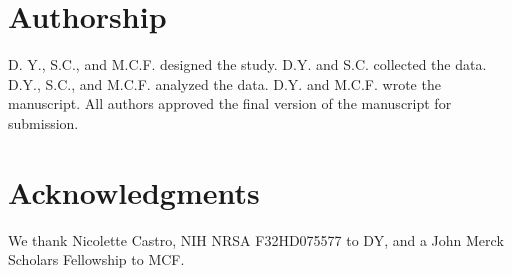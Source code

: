 \documentclass[man,floatsintext]{apa6}
\begin{document}

\section{Authorship}
D. Y., S.C., and M.C.F. designed the study. D.Y. and S.C. collected the data. D.Y., S.C., and M.C.F. analyzed the data. D.Y. and M.C.F. wrote the manuscript. All authors approved the final version of the manuscript for submission.

\section{Acknowledgments}

We thank Nicolette Castro, NIH NRSA F32HD075577 to DY, and a John Merck Scholars Fellowship to MCF.



\end{document}
